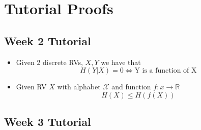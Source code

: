 \documentclass{article}
\begin{document}
\section{Tutorial Proofs}
\subsection{Week 2 Tutorial}
\begin{itemize}
    \item Given 2 discrete RVs, \(X, Y\) we have that
    \[H(Y|X) = 0 \Longleftrightarrow \text{Y is a function of X}\]
    \item Given RV \(X\) with alphabet \(\mathcal{X}\) and function \(f: x \to \mathbb{R}\)
    \[H(X) \leq H(f(X))\]
\end{itemize}
\subsection{Week 3 Tutorial}

\end{document}
